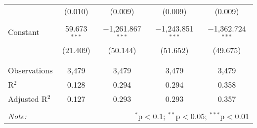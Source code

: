 \begin{table}[!htbp]
\begin{tabular}{@{\extracolsep{-5pt}}lcccc}
  & (0.010) & (0.009) & (0.009) & (0.009) \\ 
  & & & & \\ 
 Constant & 59.673$^{***}$ & $-$1,261.867$^{***}$ & $-$1,243.851$^{***}$ & $-$1,362.724$^{***}$ \\ 
  & (21.409) & (50.144) & (51.652) & (49.675) \\ 
  & & & & \\ 
\hline \\[-1.8ex] 
Observations & 3,479 & 3,479 & 3,479 & 3,479 \\ 
R$^{2}$ & 0.128 & 0.294 & 0.294 & 0.358 \\ 
Adjusted R$^{2}$ & 0.127 & 0.293 & 0.293 & 0.357 \\ 
\hline 
\hline \\[-1.8ex] 
\textit{Note:}  & \multicolumn{4}{r}{$^{*}$p$<$0.1; $^{**}$p$<$0.05; $^{***}$p$<$0.01} \\ 
\end{tabular} 
\end{table} 
